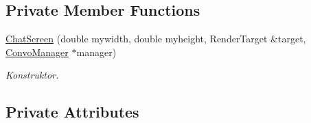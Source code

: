 \subsection*{Private Member Functions}
\begin{DoxyCompactItemize}
\item 
\mbox{\hyperlink{class_chat_screen_a015393e184776b00fcdcefcd487a8378}{Chat\+Screen}} (double mywidth, double myheight, Render\+Target \&target, \mbox{\hyperlink{class_convo_manager}{Convo\+Manager}} $\ast$manager)
\begin{DoxyCompactList}\small\item\em Konstruktor. \end{DoxyCompactList}\end{DoxyCompactItemize}
\subsection*{Private Attributes}
